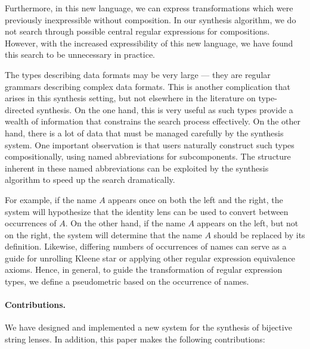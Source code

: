\documentclass[numbers]{sigplanconf}
\begin{document}
Furthermore, in this new language, we can express transformations which were
previously inexpressible without composition.
In our synthesis algorithm, we do not search through possible central regular
expressions for compositions.
However, with the increased expressibility of this new language, we have found
this search to be unnecessary in practice.

The types
describing data formats may be very large --- they are regular
grammars describing complex data formats.  This is another complication that
arises in this synthesis setting, but not elsewhere in the literature on
type-directed synthesis.  On the one hand, this is
very useful as such types provide a wealth of information that constrains
the search process effectively.  On the other hand, there is a lot of
data that must be managed carefully by the synthesis system.
One important observation is that users naturally construct
such types compositionally,
using named abbreviations for subcomponents.
The structure inherent in these named abbreviations can be 
exploited by the synthesis algorithm to speed up the search dramatically.

For example, if the name $A$ appears once on both the left and the right,
the system will hypothesize that the identity lens can be used to convert
between occurrences of $A$.  On the other hand, if the name $A$ appears
on the left, but not on the right, the system will determine that the
name $A$ should be replaced by its definition.  Likewise, differing
numbers of occurrences of names can serve as a guide for unrolling
Kleene star or applying other regular expression equivalence axioms.
Hence, in general, to guide the transformation of regular expression
types, we define a pseudometric based on the occurrence of names.

\paragraph*{Contributions.}  We have designed and implemented
a new system for the synthesis of bijective string lenses.
In addition, this paper makes the following contributions:
\end{document}
